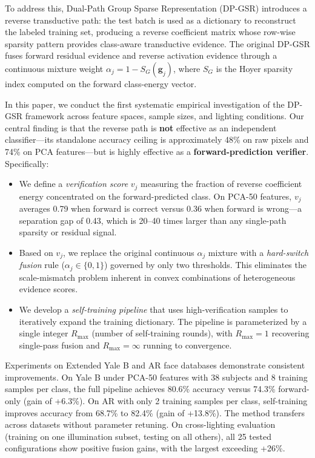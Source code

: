 \documentclass[10pt,comsoc]{IEEEtran}
\begin{document}
To address this, Dual-Path Group Sparse Representation (DP-GSR) \cite{wang2024dual} introduces a reverse transductive path: the test batch is used as a dictionary to reconstruct the labeled training set, producing a reverse coefficient matrix whose row-wise sparsity pattern provides class-aware transductive evidence. The original DP-GSR fuses forward residual evidence and reverse activation evidence through a continuous mixture weight $\alpha_j = 1 - S_G(\mathbf{g}_j)$, where $S_G$ is the Hoyer sparsity index computed on the forward class-energy vector.

In this paper, we conduct the first systematic empirical investigation of the DP-GSR framework across feature spaces, sample sizes, and lighting conditions. Our central finding is that the reverse path is \textbf{not} effective as an independent classifier---its standalone accuracy ceiling is approximately 48\% on raw pixels and 74\% on PCA features---but is highly effective as a \textbf{forward-prediction verifier}. Specifically:

\begin{itemize}
\item We define a \textit{verification score} $v_j$ measuring the fraction of reverse coefficient energy concentrated on the forward-predicted class. On PCA-50 features, $v_j$ averages 0.79 when forward is correct versus 0.36 when forward is wrong---a separation gap of 0.43, which is 20--40 times larger than any single-path sparsity or residual signal.
\item Based on $v_j$, we replace the original continuous $\alpha_j$ mixture with a \textit{hard-switch fusion} rule ($\alpha_j \in \{0,1\}$) governed by only two thresholds. This eliminates the scale-mismatch problem inherent in convex combinations of heterogeneous evidence scores.
\item We develop a \textit{self-training pipeline} that uses high-verification samples to iteratively expand the training dictionary. The pipeline is parameterized by a single integer $R_{\max}$ (number of self-training rounds), with $R_{\max}=1$ recovering single-pass fusion and $R_{\max}=\infty$ running to convergence.
\end{itemize}

Experiments on Extended Yale B and AR face databases demonstrate consistent improvements. On Yale B under PCA-50 features with 38 subjects and 8 training samples per class, the full pipeline achieves 80.6\% accuracy versus 74.3\% forward-only (gain of +6.3\%). On AR with only 2 training samples per class, self-training improves accuracy from 68.7\% to 82.4\% (gain of +13.8\%). The method transfers across datasets without parameter retuning. On cross-lighting evaluation (training on one illumination subset, testing on all others), all 25 tested configurations show positive fusion gains, with the largest exceeding +26\%.
\end{document}
